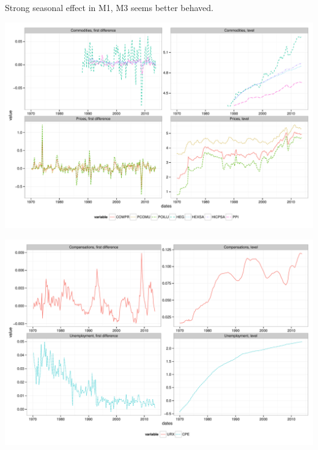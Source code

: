 \documentclass[11pt,oneside, a4paper]{amsart}\usepackage[]{graphicx}\usepackage[]{color}
\newenvironment{knitrout}{}{} %
\begin{document}
Strong seasonal effect in M1, M3 seems better behaved. 


\begin{knitrout}
\color{fgcolor}

{\centering \includegraphics[width=\textwidth]{figure/plot_price-1} 

}



\end{knitrout}




\begin{knitrout}
\color{fgcolor}

{\centering \includegraphics[width=\textwidth]{figure/plot_cou_uem-1} 

}



\end{knitrout}
\end{document}

